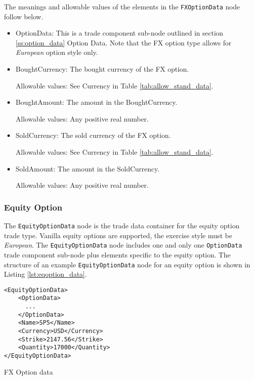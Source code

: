 The meanings and allowable values of the elements in the \lstinline!FXOptionData!  node follow below.

\begin{itemize}
\item OptionData: This is a trade component sub-node outlined in section \ref{ss:option_data} Option Data. Note that the
  FX option type allows for \emph{European} option style only.

\item BoughtCurrency: The bought currency of the FX option.  

Allowable values:  See Currency in Table \ref{tab:allow_stand_data}.

\item BoughtAmount: The amount in the BoughtCurrency.  

Allowable values:  Any positive real number.

\item SoldCurrency: The sold currency of the FX option.  

Allowable values:  See Currency in Table \ref{tab:allow_stand_data}.

\item SoldAmount: The amount in the SoldCurrency.  

Allowable values:  Any positive real number.

\end{itemize}

\subsubsection{Equity Option}

The \lstinline!EquityOptionData!  node is the trade data container for the equity option trade type.  Vanilla equity 
options are supported, the exercise style must be \emph{European}. The \lstinline!EquityOptionData!  node includes one and 
only one \lstinline!OptionData! trade component sub-node plus elements specific to the equity option. The structure of 
an example \lstinline!EquityOptionData! node for an equity option is shown in Listing
\ref{lst:eqoption_data}.

\begin{listing}[H]
\begin{verbatim}
<EquityOptionData>
    <OptionData>
      ...
    </OptionData>
    <Name>SP5</Name>
    <Currency>USD</Currency>
    <Strike>2147.56</Strike>
    <Quantity>17000</Quantity>
</EquityOptionData>
\end{verbatim}
\caption{FX Option data}
\label{lst:eqoption_data}
\end{listing}

